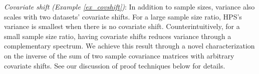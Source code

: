 \textit{Covariate shift (Example \ref{ex_covshift})}: In addition to sample sizes, variance also scales with two datasets' covariate shifts. For a large sample size ratio, HPS's  variance is smallest when there is no covariate shift. Counterintuitively, for a small sample size ratio, having covariate shifts reduces variance through a complementary spectrum. We achieve this result through a novel characterization on the inverse of the sum of two sample covariance matrices with arbitrary covariate shifts. See our discussion of proof techniques below for details.



